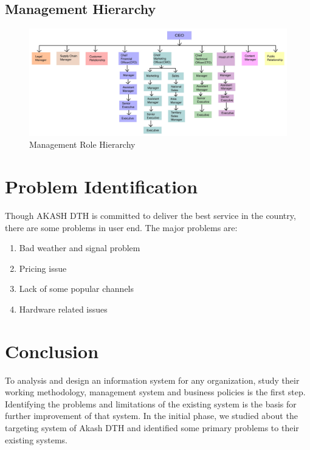 \begin{spacing}{1.0}
\subsection{Management Hierarchy}
\begin{figure}[H]
	\centering
	\includegraphics[width=\textwidth]{hierarchy}
	\caption{Management Role Hierarchy}
	\label{fig:hierarchy}
\end{figure}

\section{Problem Identification}
Though AKASH DTH is committed to deliver the best service in the country, there are some problems in user end. The major problems are:
\begin{enumerate}
\item Bad weather and signal problem
\item Pricing issue
\item Lack of some popular channels
\item Hardware related issues
\end{enumerate}

\section{Conclusion}
To analysis and design an information system for any organization, study their working methodology, management system and business policies is the first step. Identifying the problems and limitations of the existing system is the basis for further improvement of that system. In the initial phase, we studied about the targeting system of Akash DTH and identified some primary problems to their existing systems.     

\end{spacing}